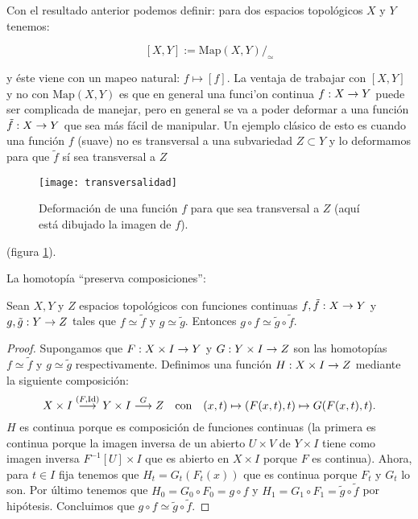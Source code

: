 \documentclass[../../topologia_algebraica.tex]{subfiles}
\begin{document}
Con el resultado anterior podemos definir: para dos espacios topol\'ogicos $X$ y $Y$ tenemos:
\begin{defin}\label{def:map_modulo_homotopia}
  \[
    [X,Y]:=\text{Map}(X,Y)/_{\simeq}
  \]
\end{defin}
y \'este viene con un mapeo natural: $f\mapsto[f]$. La ventaja de trabajar con $[X,Y]$ y no con
$\text{Map}(X,Y)$ es que en general una funci'on continua $f:X\rightarrow Y$ puede ser complicada de
manejar, pero en general se va a poder deformar a una funci\'on $\tilde{f}:X\rightarrow Y$ que sea m\'as
f\'acil de manipular. Un ejemplo cl\'asico de esto es cuando una funci\'on $f$ (suave) no es transversal
a una subvariedad $Z\subset Y$ y lo deformamos para que $\tilde{f}$ s\'i sea transversal a $Z$%
    \begin{figure}
      \caption{Deformaci\'on de una funci\'on $f$ para que sea transversal a $Z$ (aqu\'i est\'a
        dibujado la imagen de $f$).}
	\texttt{[image: transversalidad]}\centering
	\label{fig:transversalidad}
      \end{figure}
(figura \ref{fig:transversalidad}).

La homotop\'ia ``preserva composiciones'':

\begin{prop}\label{prop:homotopia_composicion}
  Sean $X,Y$ y $Z$ espacios topol\'ogicos con funciones continuas $f,\tilde{f}:X\rightarrow Y$ y
  $g,\tilde{g}:Y\rightarrow Z$ tales que $f\simeq \tilde{f}$ y $g\simeq\tilde{g}$. Entonces
  $g\circ f\simeq \tilde{g}\circ\tilde{f}$.
\end{prop}

\begin{proof}
  Supongamos que $F:X\times I\rightarrow Y$ y $G:Y\times I\rightarrow Z$ son las homotop\'ias $f\simeq\tilde{f}$
  y $g\simeq\tilde{g}$ respectivamente. Definimos una funci\'on $H:X\times I\rightarrow Z$ mediante la
  siguiente composici\'on:
  \[
    X\times I \overset{(F,\text{Id})}{\longrightarrow} Y\times I \overset{G}{\longrightarrow} Z \quad\text{con}\quad
    (x,t)\mapsto (F(x,t),t)\mapsto G(F(x,t),t). 
  \]
  $H$ es continua porque es composici\'on de funciones continuas (la primera es continua porque
  la imagen inversa de un abierto $U\times V$ de $Y\times I$ tiene como imagen inversa
  $F^{-1}[U]\times I$ que es abierto en $X\times I$ porque $F$ es continua). Ahora, para $t\in I$
  fija tenemos que $H_t=G_t(F_t(x))$ que es continua porque $F_t$ y $G_t$ lo son. Por \'ultimo
  tenemos que $H_0=G_0\circ F_0=g\circ f$ y $H_1=G_1\circ F_1=\tilde{g}\circ\tilde{f}$ por hip\'otesis.
  Concluimos que $g\circ f\simeq \tilde{g}\circ\tilde{f}$.
\end{proof}
\end{document}

